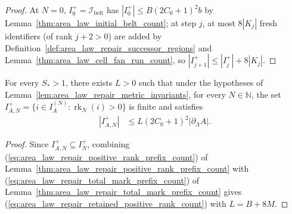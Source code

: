 \begin{proof}
    \leanok
    At $N=0$, $I_0^+=\mathcal I_{\mathrm{belt}}$ has $|I_0^+|\le B(2C_0+1)^2b$ by
    Lemma~\ref{thm:area_law_initial_belt_count}; at step $j$, at most $8|K_j|$ fresh identifiers
    (of rank $j+2>0$) are added by Definition~\ref{def:area_law_repair_successor_regions} and
    Lemma~\ref{thm:area_law_cell_fan_run_count}, so $|I_{j+1}^+|\le|I_j^+|+8|K_j|$.
\end{proof}

\begin{lemma}
    \label{thm:area_law_repair_retained_positive_rank_count}
    \leanok
    For every $S_*>1$, there exists $L>0$ such that under the hypotheses of
    Lemma~\ref{lem:area_law_repair_metric_invariants}, for every $N\in\mathbb N$, the set
    $I_{A,N}^+=\{i\in I_A^{(N)}:\operatorname{rk}_N(i)>0\}$ is finite and satisfies
    \begin{align}
        |I_{A,N}^+| & \le L(2C_0+1)^2|\partial_\Lambda A|.
        \label{eq:area_law_repair_retained_positive_rank_count}
    \end{align}
\end{lemma}

\begin{proof}
    \leanok
    Since $I_{A,N}^+\subseteq I_N^+$, combining (\ref{eq:area_law_repair_positive_rank_prefix_count})
    of Lemma~\ref{thm:area_law_repair_positive_rank_prefix_count} with
    (\ref{eq:area_law_repair_total_mark_prefix_count}) of
    Lemma~\ref{thm:area_law_repair_total_mark_prefix_count} gives
    (\ref{eq:area_law_repair_retained_positive_rank_count}) with $L=B+8M$.
\end{proof}


